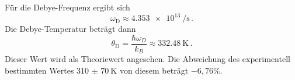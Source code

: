 Für die Debye-Frequenz ergibt sich
\begin{equation}
  \omega_\text{D} \approx \SI{4.353e13}{\per\second}\,.
\end{equation}
Die Debye-Temperatur beträgt dann
\begin{equation*}
  \theta_\text{D} = \frac{\hbar \omega_D}{k_B} \approx \SI{332.48}{\kelvin} \,.
\end{equation*}
Dieser Wert wird als Theoriewert angesehen. Die Abweichung des experimentell bestimmten Wertes $\SI{310(70)}{\kelvin}$ von diesem beträgt $-6,76\%$.
